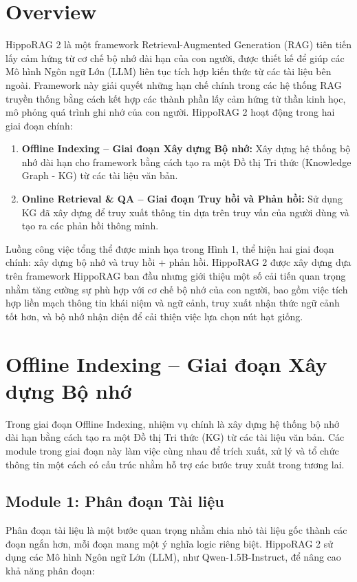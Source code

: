 \documentclass[../main.tex]{subfiles}
\begin{document}
\section{Overview}
HippoRAG 2 là một framework Retrieval-Augmented Generation (RAG) tiên tiến lấy cảm hứng từ cơ chế bộ nhớ dài hạn của con người, được thiết kế để giúp các Mô hình Ngôn ngữ Lớn (LLM) liên tục tích hợp kiến thức từ các tài liệu bên ngoài. Framework này giải quyết những hạn chế chính trong các hệ thống RAG truyền thống bằng cách kết hợp các thành phần lấy cảm hứng từ thần kinh học, mô phỏng quá trình ghi nhớ của con người. HippoRAG 2 hoạt động trong hai giai đoạn chính:

\begin{enumerate}
\item \textbf{Offline Indexing – Giai đoạn Xây dựng Bộ nhớ:} Xây dựng hệ thống bộ nhớ dài hạn cho framework bằng cách tạo ra một Đồ thị Tri thức (Knowledge Graph - KG) từ các tài liệu văn bản.
\item \textbf{Online Retrieval \& QA – Giai đoạn Truy hồi và Phản hồi:} Sử dụng KG đã xây dựng để truy xuất thông tin dựa trên truy vấn của người dùng và tạo ra các phản hồi thông minh.
\end{enumerate}

Luồng công việc tổng thể được minh họa trong Hình 1, thể hiện hai giai đoạn chính: xây dựng bộ nhớ và truy hồi + phản hồi. HippoRAG 2 được xây dựng dựa trên framework HippoRAG ban đầu nhưng giới thiệu một số cải tiến quan trọng nhằm tăng cường sự phù hợp với cơ chế bộ nhớ của con người, bao gồm việc tích hợp liền mạch thông tin khái niệm và ngữ cảnh, truy xuất nhận thức ngữ cảnh tốt hơn, và bộ nhớ nhận diện để cải thiện việc lựa chọn nút hạt giống.

\section{Offline Indexing – Giai đoạn Xây dựng Bộ nhớ}
Trong giai đoạn Offline Indexing, nhiệm vụ chính là xây dựng hệ thống bộ nhớ dài hạn bằng cách tạo ra một Đồ thị Tri thức (KG) từ các tài liệu văn bản. Các module trong giai đoạn này làm việc cùng nhau để trích xuất, xử lý và tổ chức thông tin một cách có cấu trúc nhằm hỗ trợ các bước truy xuất trong tương lai.

\subsection{Module 1: Phân đoạn Tài liệu}
Phân đoạn tài liệu là một bước quan trọng nhằm chia nhỏ tài liệu gốc thành các đoạn ngắn hơn, mỗi đoạn mang một ý nghĩa logic riêng biệt. HippoRAG 2 sử dụng các Mô hình Ngôn ngữ Lớn (LLM), như Qwen-1.5B-Instruct, để nâng cao khả năng phân đoạn:
\end{document}
